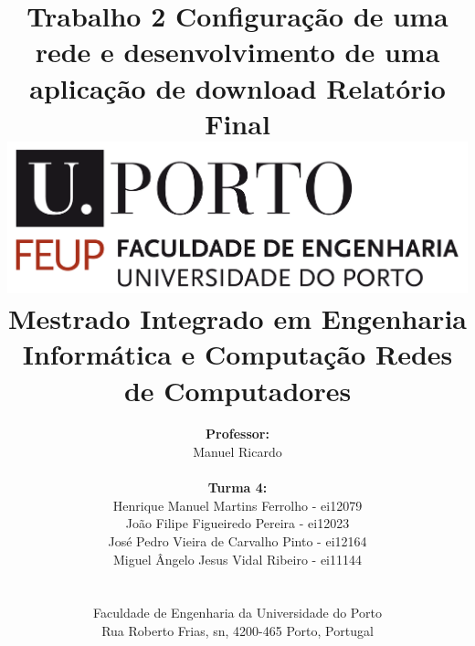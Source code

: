 \documentclass[a4paper]{article}
\begin{document}
\setlength{\textwidth}{16cm}
\setlength{\textheight}{22cm}

\title{\Huge\textbf{Trabalho 2}\linebreak\linebreak\linebreak
\LARGE{Configuração de uma rede e desenvolvimento de uma aplicação de download}\linebreak\linebreak
\Large\textbf{Relatório Final}\linebreak\linebreak
\includegraphics[scale=0.1]{res/feup-logo.png}\linebreak\linebreak\linebreak
\Large{Mestrado Integrado em Engenharia Informática e Computação} \linebreak\linebreak
\Large{Redes de Computadores}
}
\author{\textbf{Professor:}\\ Manuel Ricardo\\\\\textbf{Turma 4:}\\ Henrique Manuel Martins Ferrolho - ei12079 \\ João Filipe Figueiredo Pereira - ei12023 \\ José Pedro Vieira de Carvalho Pinto - ei12164 \\ Miguel Ângelo Jesus Vidal Ribeiro - ei11144\\\linebreak\linebreak \\
 \\ Faculdade de Engenharia da Universidade do Porto \\ Rua Roberto Frias, s\/n, 4200-465 Porto, Portugal \linebreak\linebreak\linebreak
\linebreak\linebreak\vspace{1cm}}
\maketitle
\thispagestyle{empty}
\end{document}
